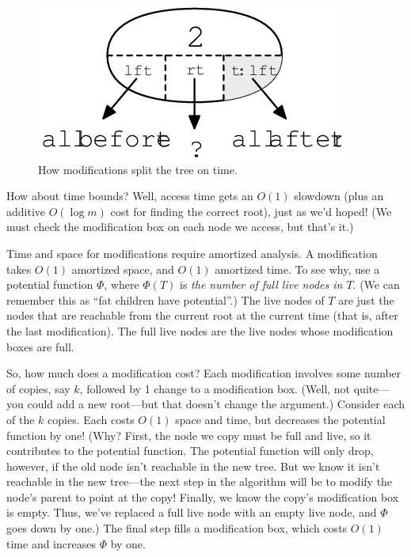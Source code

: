 \documentclass{article}
\begin{document}
\begin{figure}[ht]
\begin{center}
  \includegraphics{scribe5fig.2.png}
\end{center}
\caption{How modifications split the tree on time.}
\label{split-time}
\end{figure}

How about time bounds? Well, access time gets an $O(1)$ slowdown (plus an
additive $O(\log m)$ cost for finding the correct root), just as we'd
hoped! (We must check the modification box on each node we access, but
that's it.)

Time and space for modifications require amortized analysis. A
modification takes $O(1)$ amortized space, and $O(1)$ amortized time.
To see why, use a potential function $\Phi$, where $\Phi(T)$ is
\emph{the number of full live nodes in $T$}.
(We can remember this as ``fat children have potential''.)
The live nodes of $T$ are
just the nodes that are reachable from the current root at the current
time (that is, after the last modification). The full live nodes are
the live nodes whose modification boxes are full.

So, how much does a modification cost? Each modification involves some
number of copies, say $k$, followed by 1 change to a modification box.
(Well, not quite---you could add a new root---but that doesn't change the
argument.) Consider each of the $k$ copies. Each costs $O(1)$ space and
time, but decreases the potential function by one! (Why? First, the node we
copy must be full and live, so it contributes to the potential function.
The potential function will only drop, however, if the old node isn't
reachable in the new tree. But we know it isn't reachable in the new
tree---the next step in the algorithm will be to modify the node's parent
to point at the copy! Finally, we know the copy's modification box is
empty. Thus, we've replaced a full live node with an empty live node, and
$\Phi$ goes down by one.) The final step fills a modification box, which
costs $O(1)$ time and increases $\Phi$ by one.
\end{document}
